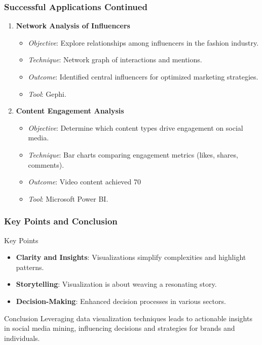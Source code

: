 \documentclass{beamer}
\begin{document}
\begin{frame}[fragile]
    \frametitle{Successful Applications Continued}
    \begin{enumerate}[resume]
        \item \textbf{Network Analysis of Influencers}
        \begin{itemize}
            \item \textit{Objective}: Explore relationships among influencers in the fashion industry.
            \item \textit{Technique}: Network graph of interactions and mentions.
            \item \textit{Outcome}: Identified central influencers for optimized marketing strategies.
            \item \textit{Tool}: Gephi.
        \end{itemize}
        
        \item \textbf{Content Engagement Analysis}
        \begin{itemize}
            \item \textit{Objective}: Determine which content types drive engagement on social media.
            \item \textit{Technique}: Bar charts comparing engagement metrics (likes, shares, comments).
            \item \textit{Outcome}: Video content achieved 70%
            \item \textit{Tool}: Microsoft Power BI.
        \end{itemize}
    \end{enumerate}
\end{frame}

\begin{frame}[fragile]
    \frametitle{Key Points and Conclusion}
    \begin{block}{Key Points}
        \begin{itemize}
            \item \textbf{Clarity and Insights}: Visualizations simplify complexities and highlight patterns.
            \item \textbf{Storytelling}: Visualization is about weaving a resonating story.
            \item \textbf{Decision-Making}: Enhanced decision processes in various sectors.
        \end{itemize}
    \end{block}
    \begin{block}{Conclusion}
        Leveraging data visualization techniques leads to actionable insights in social media mining, influencing decisions and strategies for brands and individuals.
    \end{block}
\end{frame}
\end{document}
